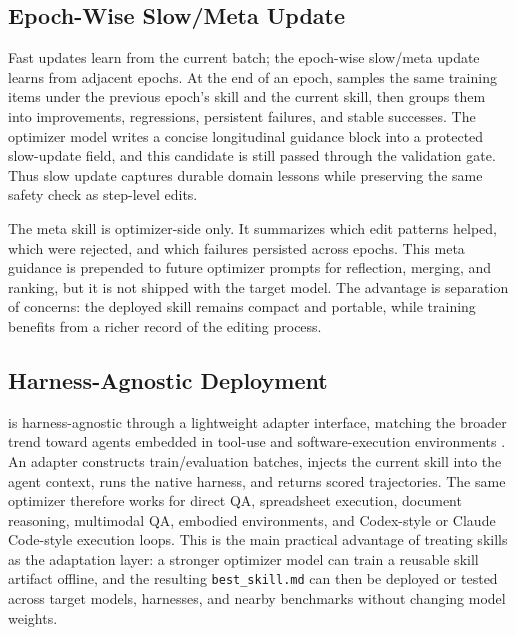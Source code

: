 \subsection{Epoch-Wise Slow/Meta Update}
\label{sec:method_slow_meta}

Fast updates learn from the current batch; the epoch-wise slow/meta update learns from adjacent epochs. At the end of an epoch, \ourmethod{} samples the same training items under the previous epoch's skill and the current skill, then groups them into improvements, regressions, persistent failures, and stable successes. The optimizer model writes a concise longitudinal guidance block into a protected slow-update field, and this candidate is still passed through the validation gate. Thus slow update captures durable domain lessons while preserving the same safety check as step-level edits.

The meta skill is optimizer-side only. It summarizes which edit patterns helped, which were rejected, and which failures persisted across epochs. This meta guidance is prepended to future optimizer prompts for reflection, merging, and ranking, but it is not shipped with the target model. The advantage is separation of concerns: the deployed skill remains compact and portable, while training benefits from a richer record of the editing process.

\subsection{Harness-Agnostic Deployment}
\label{sec:method_harness}

\ourmethod{} is harness-agnostic through a lightweight adapter interface, matching the broader trend toward agents embedded in tool-use and software-execution environments \citep{yao2022react,schick2023toolformer,yang2024sweagent}. An adapter constructs train/evaluation batches, injects the current skill into the agent context, runs the native harness, and returns scored trajectories. The same optimizer therefore works for direct QA, spreadsheet execution, document reasoning, multimodal QA, embodied environments, and Codex-style or Claude Code-style execution loops. This is the main practical advantage of treating skills as the adaptation layer: a stronger optimizer model can train a reusable skill artifact offline, and the resulting \texttt{best\_skill.md} can then be deployed or tested across target models, harnesses, and nearby benchmarks without changing model weights.

